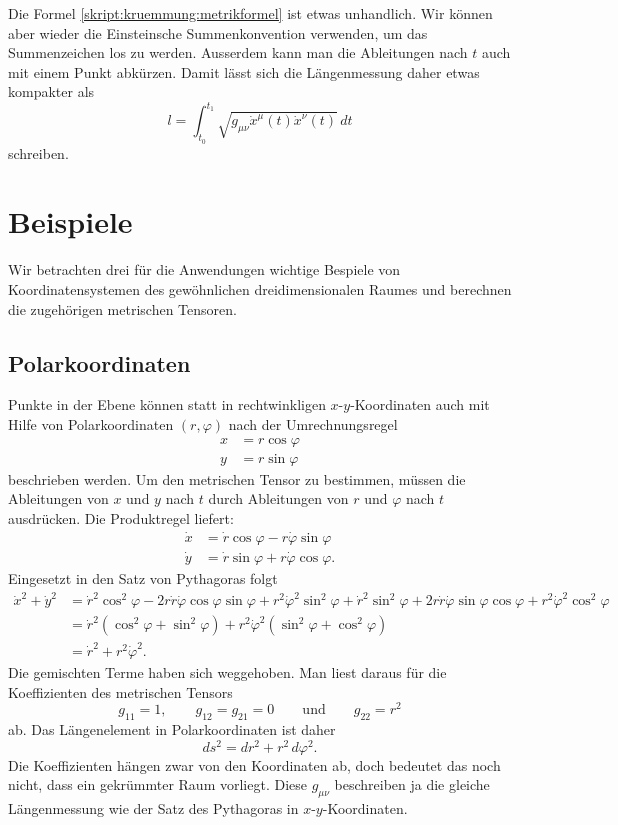 Die Formel \eqref{skript:kruemmung:metrikformel} ist etwas unhandlich.
Wir können aber wieder die Einsteinsche Summenkonvention verwenden,
um das Summenzeichen los zu werden.
Ausserdem kann man die Ableitungen nach $t$ auch mit einem Punkt abkürzen.
Damit lässt sich die Längenmessung daher etwas kompakter als
\[
l=\int_{t_0}^{t_1} \sqrt{g_{\mu\nu}\dot x^{\mu}(t) \dot x^{\nu}(t)}\,dt
\]
schreiben.

\section{Beispiele}
Wir betrachten drei für die Anwendungen wichtige Bespiele von
Koordinatensystemen des gewöhnlichen dreidimensionalen Raumes
und berechnen die zugehörigen metrischen Tensoren.

\subsection{Polarkoordinaten}
Punkte in der Ebene können statt in rechtwinkligen $x$-$y$-Koordinaten
auch mit Hilfe von Polarkoordinaten $(r,\varphi)$ nach der Umrechnungsregel
\begin{align*}
x&=r\cos\varphi\\
y&=r\sin\varphi
\end{align*}
beschrieben werden.
Um den metrischen Tensor zu bestimmen, müssen die Ableitungen von $x$ 
und $y$ nach $t$ durch Ableitungen von $r$ und $\varphi$ nach $t$ 
ausdrücken.
Die Produktregel liefert:
\begin{align*}
\dot x&= \dot r\cos \varphi - r\dot\varphi \sin\varphi 
\\
\dot y&= \dot r\sin\varphi + r\dot\varphi\cos\varphi.
\end{align*}
Eingesetzt in den Satz von Pythagoras folgt
\begin{align*}
\dot x^2 + \dot y^2
&=
\dot r^2\cos^2\varphi -2r\dot r\dot\varphi\cos\varphi\sin\varphi +r^2\dot \varphi^2\sin^2\varphi
+
\dot r^2\sin^2\varphi +2r\dot r\dot\varphi\sin\varphi\cos\varphi +r^2\dot\varphi^2\cos^2\varphi
\\
&=
\dot r^2(\cos^2\varphi+\sin^2\varphi)+ r^2\dot\varphi^2(\sin^2\varphi+\cos^2\varphi)
\\
&=\dot r^2 + r^2\dot\varphi^2.
\end{align*}
Die gemischten Terme haben sich weggehoben.
Man liest daraus für die Koeffizienten des metrischen Tensors
\[
g_{11}=1,\qquad g_{12}=g_{21}=0\qquad\text{und}\qquad g_{22}=r^2
\]
ab.
Das Längenelement in Polarkoordinaten ist daher
\[
ds^2
=
dr^2 + r^2\,d\varphi^2.
\]
Die Koeffizienten hängen zwar von den Koordinaten ab, doch bedeutet
das noch nicht, dass ein gekrümmter Raum vorliegt.
Diese $g_{\mu\nu}$ beschreiben ja die gleiche Längenmessung wie der Satz
des Pythagoras in $x$-$y$-Koordinaten.

